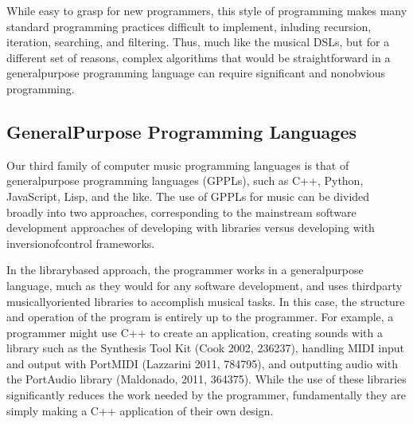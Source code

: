 \documentclass[letterpaper,10pt,english]{sphinxmanual}
\begin{document}
\sphinxAtStartPar
While easy to grasp for new programmers,
this style of programming makes many standard programming practices difficult to implement,
inluding recursion, iteration, searching, and filtering.
Thus, much like the musical DSLs, but for a different set of reasons, complex
algorithms that would be straightforward in a general\sphinxhyphen{}purpose programming language can require
significant and non\sphinxhyphen{}obvious programming.


\subsection{General\sphinxhyphen{}Purpose Programming Languages}
\label{\detokenize{background:general-purpose-programming-languages}}
\sphinxAtStartPar
Our third family of computer music programming languages is that of
general\sphinxhyphen{}purpose programming languages (GPPLs), such as C++, Python, JavaScript, Lisp, and the like.
The use of GPPLs for music can be divided broadly
into two approaches, corresponding to the mainstream software development
approaches of developing with libraries versus developing with
inversion\sphinxhyphen{}of\sphinxhyphen{}control frameworks.

\sphinxAtStartPar
In the library\sphinxhyphen{}based approach, the programmer works in a general\sphinxhyphen{}purpose language,
much as they would for any software development, and uses third\sphinxhyphen{}party
musically\sphinxhyphen{}oriented libraries to accomplish musical tasks.
In this case, the structure and operation of the program is entirely up to the programmer.
For example, a programmer might use C++ to create an application, creating sounds
with a library such as the Synthesis Tool Kit (Cook 2002, 236\sphinxhyphen{}237),
handling MIDI input and output with PortMIDI (Lazzarini 2011, 784\sphinxhyphen{}795),
and outputting audio with the PortAudio library (Maldonado, 2011, 364\sphinxhyphen{}375).
While the use of these libraries significantly reduces the work needed by the programmer,
fundamentally they are simply making a C++ application of their own design.
\end{document}
